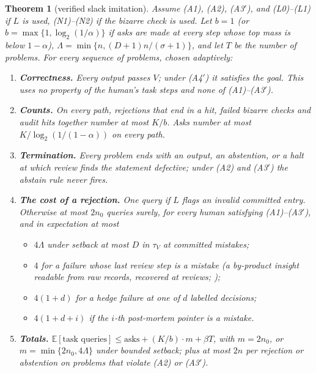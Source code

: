 \documentclass[11pt]{article}
\newtheorem{theorem}{Theorem}[section]
\theoremstyle{definition}
\theoremstyle{remark}
\newcommand{\K}{K}
\newcommand{\tauV}{\tau_{V}}
\newcommand{\Ex}{\mathbb{E}}
\begin{document}
\begin{theorem}[verified slack imitation]\label{thm:main}
Assume (A1), (A2), (A3$'$), and (L0)--(L1) if $L$ is used, (N1)--(N2) if the bizarre check is used. Let $b=1$ (or $b=\max\{1,\log_2(1/\alpha)\}$ if asks are made at every step whose top mass is below $1-\alpha$), $\Lambda=\min\{n,(D+1)n/(\sigma+1)\}$, and let $T$ be the number of problems. For every sequence of problems, chosen adaptively:
\begin{enumerate}[label=(\alph*)]
\item \textbf{Correctness.} Every output passes $V$; under (A4$'$) it satisfies the goal. This uses no property of the human's task steps and none of (A1)--(A3$'$).
\item \textbf{Counts.} On every path, rejections that end in a hit, failed bizarre checks and audit hits together number at most $\K/b$. Asks number at most $\K/\log_2(1/(1-\alpha))$ on every path.
\item \textbf{Termination.} Every problem ends with an output, an abstention, or a halt at which review finds the statement defective; under (A2) and (A3$'$) the abstain rule never fires.
\item \textbf{The cost of a rejection.} One query if $L$ flags an invalid committed entry. Otherwise at most $2n_0$ queries surely, for every human satisfying (A1)--(A3$'$), and in expectation at most
\begin{itemize}[nosep]
\item $4\Lambda$ under setback at most $D$ in $\tauV$ at committed mistakes;
\item $4$ for a failure whose last review step is a mistake (a by-product insight readable from raw records, recovered at reviews; \cite{threadG});
\item $4(1+d)$ for a hedge failure at one of $d$ labelled decisions;
\item $4(1+d+i)$ if the $i$-th post-mortem pointer is a mistake.
\end{itemize}
\item \textbf{Totals.} $\Ex[\text{task queries}]\le \text{asks}+(\K/b)\cdot m+\beta T$, with $m=2n_0$, or $m=\min\{2n_0,4\Lambda\}$ under bounded setback; plus at most $2n$ per rejection or abstention on problems that violate (A2) or (A3$'$).
\end{enumerate}
\end{theorem}
\end{document}
